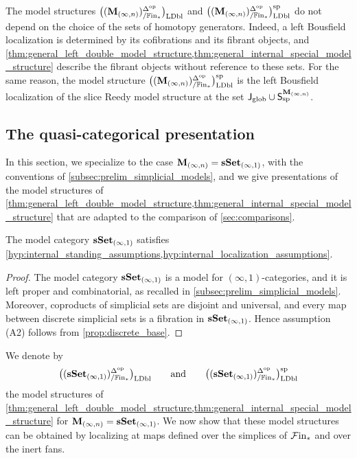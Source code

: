 \documentclass[10pt,reqno]{amsart}
\begin{document}
\begin{rmk}
\label{rem:independence_generators}
The model structures $\bigl((\mathbf M_{(\infty,n)})^{\Delta^{\mathrm{op}}}_{/\mathbb{F}\mathrm{in}_*}\bigr)_{\mathrm{LDbl}}$ and $\bigl((\mathbf M_{(\infty,n)})^{\Delta^{\mathrm{op}}}_{/\mathbb{F}\mathrm{in}_*}\bigr)_{\mathrm{LDbl}}^{\mathrm{sp}}$ do not
depend on the choice of the sets of homotopy generators. Indeed, a
left Bousfield localization is determined by its cofibrations and its
fibrant objects, and
\cref{thm:general_left_double_model_structure,thm:general_internal_special_model_structure}
describe the fibrant objects without reference to these sets. For the
same reason, the model structure $\bigl((\mathbf M_{(\infty,n)})^{\Delta^{\mathrm{op}}}_{/\mathbb{F}\mathrm{in}_*}\bigr)_{\mathrm{LDbl}}^{\mathrm{sp}}$ is the left
Bousfield localization of the slice Reedy model structure at the set
$\mathsf J_{\mathrm{glob}}\cup\mathsf S_{\mathrm{sp}}^{\mathbf M_{(\infty,n)}}$.
\end{rmk}

\subsection{The quasi-categorical presentation}
\label{subsec:general_n_specialization}

In this section, we specialize to the case
$\mathbf M_{(\infty,n)}=\mathbf{sSet}_{(\infty,1)}$, with the conventions of
\cref{subsec:prelim_simplicial_models}, and we give presentations of
the model structures of
\cref{thm:general_left_double_model_structure,thm:general_internal_special_model_structure}
that are adapted to the comparison of \cref{sec:comparisons}.

\begin{proposition}
\label{prop:quasicategorical_standing_assumptions}
The model category $\mathbf{sSet}_{(\infty,1)}$ satisfies
\cref{hyp:internal_standing_assumptions,hyp:internal_localization_assumptions}.
\end{proposition}

\begin{proof}
The model category $\mathbf{sSet}_{(\infty,1)}$ is a model for
$(\infty,1)$-categories, and it is left proper and combinatorial, as
recalled in \cref{subsec:prelim_simplicial_models}. Moreover,
coproducts of simplicial sets are disjoint and universal, and every
map between discrete simplicial sets is a fibration in
$\mathbf{sSet}_{(\infty,1)}$. Hence assumption \textup{(A2)} follows from
\cref{prop:discrete_base}.
\end{proof}

We denote by
\[
\bigl((\mathbf{sSet}_{(\infty,1)})^{\Delta^{\mathrm{op}}}_{/\mathbb{F}\mathrm{in}_*}\bigr)_{\mathrm{LDbl}}
\qquad\text{and}\qquad
\bigl((\mathbf{sSet}_{(\infty,1)})^{\Delta^{\mathrm{op}}}_{/\mathbb{F}\mathrm{in}_*}\bigr)_{\mathrm{LDbl}}^{\mathrm{sp}}
\]
the model structures of
\cref{thm:general_left_double_model_structure,thm:general_internal_special_model_structure}
for $\mathbf M_{(\infty,n)}=\mathbf{sSet}_{(\infty,1)}$. We now show that these model
structures can be obtained by localizing at maps defined over the
simplices of $\mathcal{F}\mathrm{in}_*$ and over the inert fans.
\end{document}
